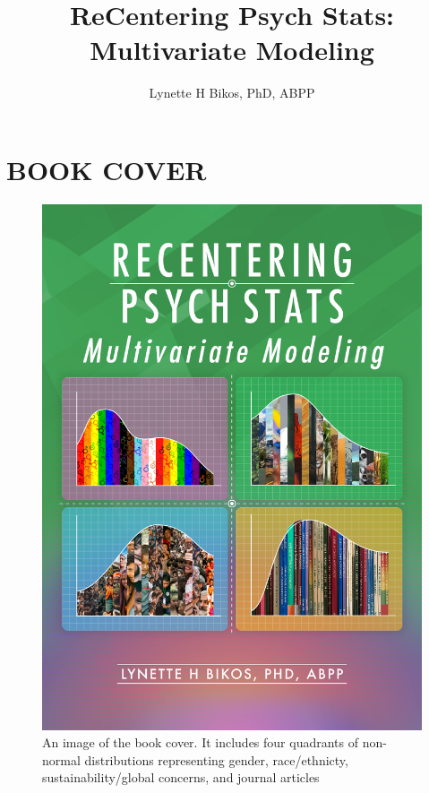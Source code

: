\documentclass[
  english,
]{book}
\title{ReCentering Psych Stats: Multivariate Modeling}
\author{Lynette H Bikos, PhD, ABPP}
\date{}
\begin{document}
\maketitle

{
\setcounter{tocdepth}{1}
\tableofcontents
}
\hypertarget{book-cover}{%
\chapter*{BOOK COVER}\label{book-cover}}

\begin{figure}
\centering
\includegraphics{images/ReC_multivariate_bkcvr.png}
\caption{An image of the book cover. It includes four quadrants of non-normal distributions representing gender, race/ethnicty, sustainability/global concerns, and journal articles}
\end{figure}
\end{document}
